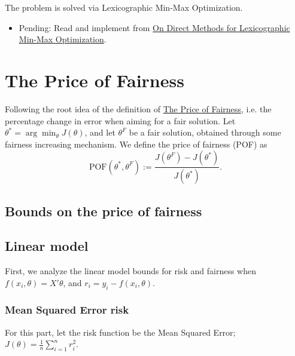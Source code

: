 \documentclass{article}
\begin{document}
The problem is solved via Lexicographic Min-Max
Optimization.

\begin{itemize}
    \item Pending: Read and implement from \href{https://link.springer.com/chapter/10.1007/11751595_85}{On Direct Methods for Lexicographic Min-Max Optimization}.
\end{itemize}


\newpage
\section{The Price of Fairness}

Following the root idea of the definition of \href{https://pubsonline.informs.org/doi/10.1287/opre.1100.0865}{The Price of Fairness}, i.e. the percentage change in error when aiming for a fair solution. Let $\theta^*=\arg\min_{\theta} J(\theta)$, and let $\theta^F$ be a fair solution, obtained through some fairness increasing mechanism. We define the price of fairness (POF) as  
\begin{equation}
    \text{POF}(\theta^*, \theta^F):= \frac{J(\theta^F) - J(\theta^*)}{J(\theta^*)}.
\end{equation}

\subsection{Bounds on the price of fairness}


\subsection{Linear model}

    First, we analyze the linear model bounds for risk and fairness when $f(x_i,\theta)=X'\theta$, and $r_i=y_i-f(x_i,\theta)$. 



\subsubsection{Mean Squared Error risk}

    For this part, let the risk function be the Mean Squared Error; $J(\theta)=\frac{1}{n}\sum_{i=1}^nr_i^2$.
\end{document}
